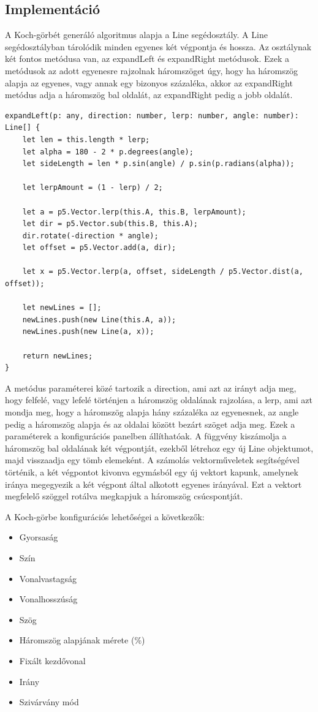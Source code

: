 \subsection*{Implementáció}
A Koch-görbét generáló algoritmus alapja a Line segédosztály. A Line segédosztályban tárolódik minden egyenes két végpontja és hossza. Az osztálynak két fontos metódusa van, az expandLeft és expandRight metódusok. Ezek a metódusok az adott egyenesre rajzolnak háromszöget úgy, hogy ha háromszög alapja az egyenes, vagy annak egy bizonyos százaléka, akkor az expandRight metódus adja a háromszög bal oldalát, az expandRight pedig a jobb oldalát.
\begin{lstlisting}
expandLeft(p: any, direction: number, lerp: number, angle: number): Line[] {
	let len = this.length * lerp;
	let alpha = 180 - 2 * p.degrees(angle);
	let sideLength = len * p.sin(angle) / p.sin(p.radians(alpha));
	
	let lerpAmount = (1 - lerp) / 2;
	
	let a = p5.Vector.lerp(this.A, this.B, lerpAmount);
	let dir = p5.Vector.sub(this.B, this.A);
	dir.rotate(-direction * angle);
	let offset = p5.Vector.add(a, dir);
	
	let x = p5.Vector.lerp(a, offset, sideLength / p5.Vector.dist(a, offset));
	
	let newLines = [];
	newLines.push(new Line(this.A, a));
	newLines.push(new Line(a, x));
	
	return newLines;
}
\end{lstlisting}
A metódus paraméterei közé tartozik a direction, ami azt az irányt adja meg, hogy felfelé, vagy lefelé történjen a háromszög oldalának rajzolása, a lerp, ami azt mondja meg, hogy a háromszög alapja hány százaléka az egyenesnek, az angle pedig a háromszög alapja és az oldalai között bezárt szöget adja meg. Ezek a paraméterek a konfigurációs panelben állíthatóak. A függvény kiszámolja a háromszög bal oldalának két végpontját, ezekből létrehoz egy új Line objektumot, majd visszaadja egy tömb elemeként. A számolás vektorműveletek segítségével történik, a két végpontot kivonva egymásból egy új vektort kapunk, amelynek iránya megegyezik a két végpont által alkotott egyenes irányával. Ezt a vektort megfelelő szöggel rotálva megkapjuk a háromszög csúcspontját. 
\par A Koch-görbe konfigurációs lehetőségei a következők:
\begin{itemize}
	\item Gyorsaság
	\item Szín
	\item Vonalvastagság
	\item Vonalhosszúság
	\item Szög
	\item Háromszög alapjának mérete (\%)
	\item Fixált kezdővonal
	\item Irány
	\item Szivárvány mód
\end{itemize}
